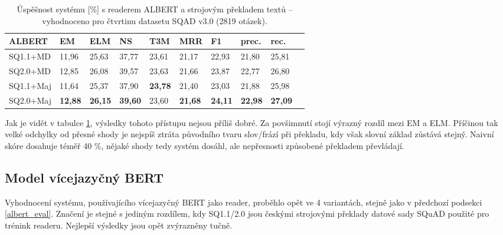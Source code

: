 \begin{table}[H]
    \centering
    \begin{tabular}{|l||l|l|l|l|l|l|l|l|l|}
        \hline
        \textbf{ALBERT}  & \textbf{EM}   & ELM       & NS        & T3M       & MRR       & \textbf{F1}   & prec.         & rec. \\ \hline\hline
            SQ1.1+MD    & 11,96         & 25,63     & 37,77     & 23,61     & 21,17     & 22,93         & 21,80         & 25,81    \\ \hline
            SQ2.0+MD    & 12,85         & 26,08     & 39,57     & 23,63     & 21,66     & 23,87         & 22,77         & 26,80    \\ \hline
            SQ1.1+Maj   & 11,64         & 25,37     & 37,90     & \textbf{23,78}     & 21,40     & 23,03         & 21,88         & 25,98    \\ \hline
            SQ2.0+Maj   & \textbf{12,88}& \textbf{26,15}& \textbf{39,60}& 23,60     & \textbf{21,68}     & \textbf{24,11}         & \textbf{22,98}         & \textbf{27,09}    \\ \hline
    \end{tabular}
    \caption{Úspěšnost systému [\%] s readerem ALBERT a strojovým překladem textů -- vyhodnoceno pro čtvrtinu datasetu SQAD v3.0 (2819 otázek).}
    \label{tab:system_eval_albert}
\end{table}
Jak je vidět v tabulce \ref{tab:system_eval_albert}, výsledky tohoto přístupu nejsou příliš dobré. Za povšimnutí stojí výrazný rozdíl mezi EM a ELM. Příčinou tak velké odchylky od přesné shody je nejspíš ztráta původního tvaru slov/frází při překladu, kdy však slovní základ zůstává stejný. Naivní skóre dosahuje téměř 40 \%, nějaké shody tedy systém dosáhl, ale nepřesnosti způsobené překladem převládají.

\subsection{Model vícejazyčný BERT}
\label{mbert_eval}
Vyhodnocení systému, používajícího vícejazyčný BERT jako reader, proběhlo opět ve 4 variantách, stejně jako v předchozí podsekci \ref{albert_eval}. Značení je stejné s jediným rozdílem, kdy SQ1.1/2.0 jsou českými strojovými překlady datové sady SQuAD použité pro trénink readeru. Nejlepší výsledky jsou opět zvýrazněny tučně.


